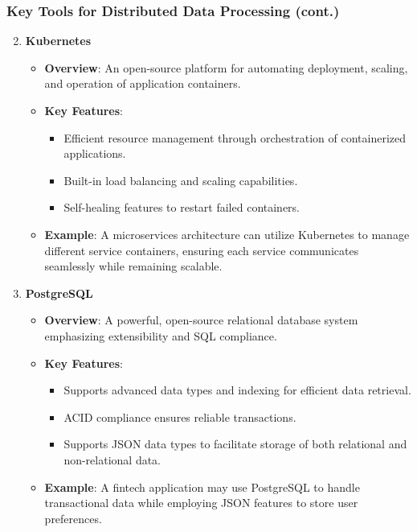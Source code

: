 \documentclass[aspectratio=169]{beamer}
\begin{document}
\begin{frame}[fragile]
  \frametitle{Key Tools for Distributed Data Processing (cont.)}
  \begin{enumerate}
    \setcounter{enumi}{1} %
    \item \textbf{Kubernetes}
      \begin{itemize}
        \item \textbf{Overview}: An open-source platform for automating deployment, scaling, and operation of application containers.
        \item \textbf{Key Features}:
          \begin{itemize}
            \item Efficient resource management through orchestration of containerized applications.
            \item Built-in load balancing and scaling capabilities.
            \item Self-healing features to restart failed containers.
          \end{itemize}
        \item \textbf{Example}: A microservices architecture can utilize Kubernetes to manage different service containers, ensuring each service communicates seamlessly while remaining scalable.
      \end{itemize}

    \setcounter{enumi}{2} %
    \item \textbf{PostgreSQL}
      \begin{itemize}
        \item \textbf{Overview}: A powerful, open-source relational database system emphasizing extensibility and SQL compliance.
        \item \textbf{Key Features}:
          \begin{itemize}
            \item Supports advanced data types and indexing for efficient data retrieval.
            \item ACID compliance ensures reliable transactions.
            \item Supports JSON data types to facilitate storage of both relational and non-relational data.
          \end{itemize}
        \item \textbf{Example}: A fintech application may use PostgreSQL to handle transactional data while employing JSON features to store user preferences.
      \end{itemize}
  \end{enumerate}
\end{frame}
\end{document}
